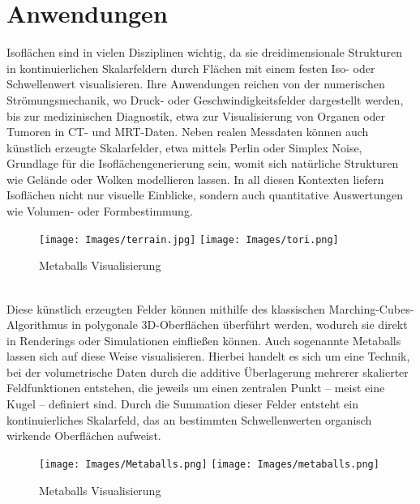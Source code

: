 \documentclass[12pt]{article}
\begin{document}
\section{Anwendungen}
Isoflächen sind in vielen Disziplinen wichtig, da sie dreidimensionale Strukturen in kontinuierlichen Skalarfeldern durch Flächen mit einem festen Iso- oder Schwellenwert visualisieren.
Ihre Anwendungen reichen von der numerischen Strömungsmechanik, wo Druck- oder Geschwindigkeitsfelder dargestellt werden, bis zur medizinischen Diagnostik,
etwa zur Visualisierung von Organen oder Tumoren in CT- und MRT-Daten.
Neben realen Messdaten können auch künstlich erzeugte Skalarfelder, etwa mittels Perlin oder Simplex Noise, Grundlage für die Isoflächengenerierung sein,
womit sich natürliche Strukturen wie Gelände oder Wolken modellieren lassen.
In all diesen Kontexten liefern Isoflächen nicht nur visuelle Einblicke, sondern auch quantitative Auswertungen wie Volumen- oder Formbestimmung.
\begin{figure}[h]
    \centering
    \texttt{[image: Images/terrain.jpg]}
    \hspace{1cm}
    \texttt{[image: Images/tori.png]}
    \caption{Metaballs Visualisierung}
\end{figure}\\
Diese künstlich erzeugten Felder können mithilfe des klassischen Marching-Cubes-Algorithmus in polygonale 3D-Oberflächen überführt werden,
wodurch sie direkt in Renderings oder Simulationen einfließen können.
Auch sogenannte Metaballs lassen sich auf diese Weise visualisieren. Hierbei handelt es sich um eine Technik,
bei der volumetrische Daten durch die additive Überlagerung mehrerer skalierter Feldfunktionen entstehen,
die jeweils um einen zentralen Punkt – meist eine Kugel – definiert sind.
Durch die Summation dieser Felder entsteht ein kontinuierliches Skalarfeld, das an bestimmten Schwellenwerten organisch wirkende Oberflächen aufweist.
\begin{figure}[h]
    \centering
    \texttt{[image: Images/Metaballs.png]}
    \hspace{1cm}
    \texttt{[image: Images/metaballs.png]}
    \caption{Metaballs Visualisierung}
\end{figure}
\newpage
\end{document}
